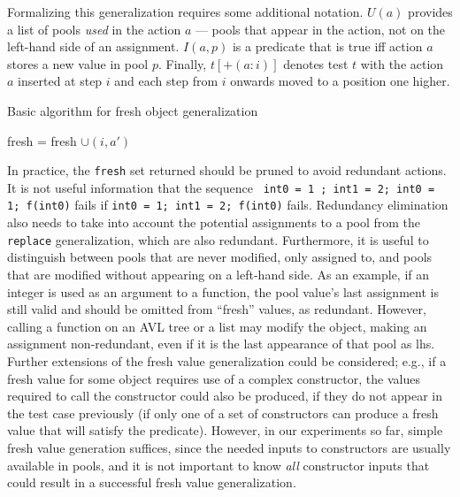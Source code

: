 Formalizing this generalization requires some additional notation.
$U(a)$ provides a list of pools \emph{used} in the action $a$ --- pools that
appear in the action, not on the left-hand side of an assignment.
$I(a,p)$ is a predicate that is true iff action $a$ stores a new value
in pool $p$.  Finally, $t[+(a: i)]$ denotes test $t$ with the action
$a$ inserted at step $i$ and each step from $i$ onwards moved to a
position one higher.

\begin{algorithm}
\caption{Basic algorithm for fresh object generalization}
\label{freshalg}
\begin{algorithmic}[1]
\State fresh = fresh $\cup (i,a')$
\EndIf
\EndFor 
\EndFor
\EndFor
{}
\end{algorithmic}
\end{algorithm}

In practice, the {\tt fresh} set returned should be pruned to avoid
redundant actions.  It is not useful information that the sequence {\tt
  int0 = 1 ; int1 = 2; int0 = 1; f(int0)} fails if {\tt int0 = 1; int1
  = 2; f(int0)} fails.  Redundancy elimination also needs to take into
account the potential assignments to a pool from the {\tt replace}
generalization, which are also redundant.  Furthermore, it is useful
to distinguish between pools that are never modified, only assigned
to, and pools that are modified without appearing on a left-hand
side.  As an example, if an integer is used as an argument to a
function, the pool value's last assignment is still valid and should
be omitted from ``fresh'' values, as redundant.  However, calling a
function on an AVL tree or a list may modify the object, making an
assignment non-redundant, even if it is the last appearance of that
pool as lhs.  Further extensions of the fresh value generalization
could be considered; e.g., if a fresh value for some object requires use
of a complex constructor, the values required to call the constructor
could also be produced, if they do not appear in the test case
previously (if only one of a set of constructors can produce a fresh
value that will satisfy the predicate).  However, in our experiments
so far, simple fresh value generation suffices, since the needed
inputs to constructors are usually available in pools, and it is not
important to know \emph{all} constructor inputs that could result in a
successful fresh value generalization.

